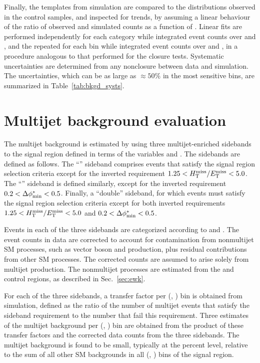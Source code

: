 Finally, the \mht templates from simulation are compared to the
distributions observed in the control samples, and inspected for
trends, by assuming a linear behaviour of the ratio of observed and
simulated counts as a function of \mht. Linear fits are performed
independently for each \njet category while integrated event counts
over \nb and \scalht, and the repeated for each \scalht bin while
integrated event counts over \njet and \nb, in a procedure analogous
to that performed for the closure tests. Systematic uncertainties are
determined from any nonclosure between data and simulation. The
uncertainties, which can be as large as ${\approx}50\%$ in the most
sensitive \mht bins, are summarized in Table~\ref{tab:bkgd_systs}.


\section{Multijet background evaluation}
\label{sec:qcd}

The multijet background is estimated by using three multijet-enriched
sidebands to the signal region defined in terms of the variables
\mhtmet and \bdphi. The sidebands are defined as follows. The
``\mhtmet'' sideband comprises events that satisfy the signal region
selection criteria except for the inverted requirement $1.25 < H_{\text{T}}^{\text{miss}} / E_{\text{T}}^{\text{miss}}
< 5.0$. The ``\bdphi'' sideband is defined similarly, except for the
inverted requirement $0.2 < \Delta\phi^{*}_\text{min} < 0.5$. Finally, a ``double''
sideband, for which events must satisfy the signal region selection
criteria except for both inverted requirements $1.25 < H_{\text{T}}^{\text{miss}} / E_{\text{T}}^{\text{miss}} < 5.0$
and $0.2 < \Delta\phi^{*}_\text{min} < 0.5$.

Events in each of the three sidebands are categorized according to
\njet and \scalht. The event counts in data are corrected to account
for contamination from nonmultijet SM processes, such as vector boson
and \ttbar production, plus residual contributions from other SM
processes. The corrected counts are assumed to arise solely from
multijet production. The nonmultijet processes are estimated from the
\mj and \mmj control regions, as described in Sec.~\ref{sec:ewk}.

For each of the three sidebands, a transfer factor per (\njet,
\scalht) bin is obtained from simulation, defined as the ratio of the
number of multijet events that satisfy the sideband requirement to the
number that fail this requirement. Three estimates of the multijet
background per (\njet, \scalht) bin are obtained from the product of
these transfer factors and the corrected data counts from the three
sidebands. The multijet background is found to be small, typically at
the percent level, relative to the sum of all other SM backgrounds in
all (\njet, \nb) bins of the signal region.

